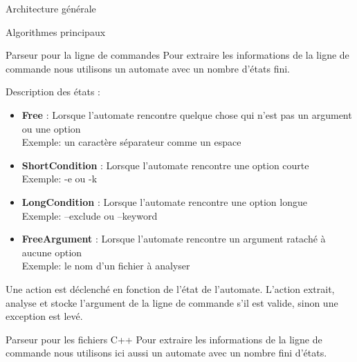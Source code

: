 \documentclass{article}
\begin{document}
\begin{section}{Architecture générale}
\end{section}


\begin{section}{Algorithmes principaux}

  \begin{subsection}{Parseur pour la ligne de commandes}
  Pour extraire les informations de la ligne de commande nous utilisons un automate avec un nombre d'états fini.
  
  \begin{paragraph}{Description des états :}
    \begin{itemize}
      \item \textbf{Free} : Lorsque l'automate rencontre quelque chose qui n'est pas un argument ou une option \\Exemple: un caractère séparateur comme un espace
      \item \textbf{ShortCondition} : Lorsque l'automate rencontre une option courte \\Exemple: -e ou -k
      \item \textbf{LongCondition} : Lorsque l'automate rencontre une option longue \\Exemple: --exclude ou --keyword
      \item \textbf{FreeArgument} : Lorsque l'automate rencontre un argument rataché à aucune option\\Exemple: le nom d'un fichier à analyser\\
    \end{itemize}
  \end{paragraph}
  
  Une action est déclenché en fonction de l'état de l'automate. L'action extrait, analyse et stocke l'argument de la ligne de commande s'il est valide, sinon une exception est levé.
  \end{subsection}

  \begin{subsection}{Parseur pour les fichiers C++}
  Pour extraire les informations de la ligne de commande nous utilisons ici aussi un automate avec un nombre fini d'états.
  

\end{subsection}
\end{section}
\end{document}
